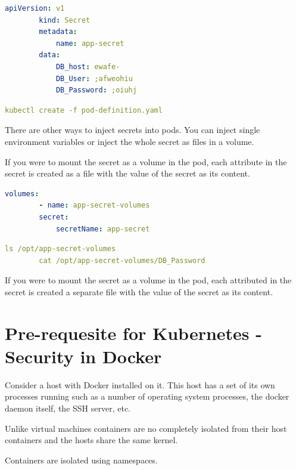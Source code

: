 \documentclass[11pt]{book}
\begin{document}
    \begin{lstlisting}[language=yaml, caption={secret-data.yaml}]
        apiVersion: v1
        kind: Secret
        metadata:
            name: app-secret
        data:
            DB_host: ewafe-
            DB_User: ;afweohiu
            DB_Password: ;oiuhj
    \end{lstlisting}

    \begin{lstlisting}[language=yaml, caption={Declarative creation}]
        kubectl create -f pod-definition.yaml
    \end{lstlisting}

    There are other ways to inject secrets into pods.
    You can inject single environment variables or inject the whole secret as files in a volume.

    If you were to mount the secret as a volume in the pod, each attribute in the secret is created as a file with the value of the secret as its content.

    \begin{lstlisting}[language=yaml, caption={secret-data.yaml}]
        volumes:
        - name: app-secret-volumes
        secret:
            secretName: app-secret
    \end{lstlisting}

    \begin{lstlisting}[language=yaml, caption={Commands to run from within the container}]
        ls /opt/app-secret-volumes
        cat /opt/app-secret-volumes/DB_Password
    \end{lstlisting}

    If you were to mount the secret as a volume in the pod, each attributed in the secret is created a separate file with the value of the secret as its content.


    \section{Pre-requesite for Kubernetes - Security in Docker}
    Consider a host with Docker installed on it.
    This host has a set of its own processes running such as a number of operating system processes, the docker daemon itself, the SSH server, etc.

    Unlike virtual machines containers are no completely isolated from their host containers and the hosts share the same kernel.

    Containers are isolated using namespaces.
\end{document}
